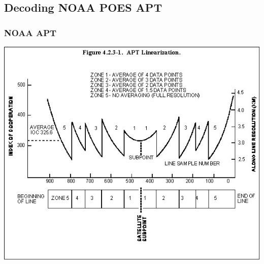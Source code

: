 \documentclass[]{beamer}
\begin{document}
\subsection{Decoding NOAA POES APT}
\frame{\subsectionpage}
\begin{frame}
    \frametitle{NOAA APT}
    \begin{center}
    \includegraphics[width=0.75\paperwidth,height=0.75\paperheight,keepaspectratio]{images/apt-freq.jpg}
    \end{center}
\end{frame}
\end{document}
